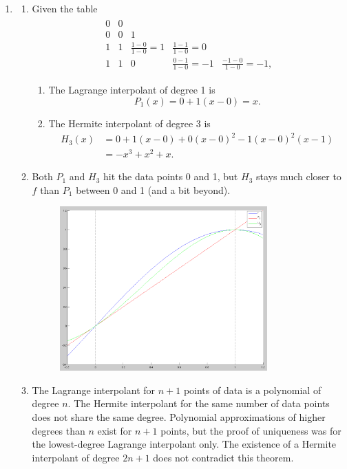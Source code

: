 \documentclass[12pt,letterpaper]{article}
\begin{document}
\begin{enumerate}
  \item
    \begin{enumerate}
      \item Given the table
        \begin{align*}
          \begin{matrix}
            0 & 0 \\
            0 & 0 & 1 \\
            1 & 1 & \frac{1-0}{1-0}=1 & \frac{1-1}{1-0}=0 \\
            1 & 1 & 0 & \frac{0-1}{1-0}=-1 & \frac{-1-0}{1-0}=-1,
          \end{matrix}
        \end{align*}
        \begin{enumerate}
          \item The Lagrange interpolant of degree 1 is
            \[P_1(x) = 0 + 1(x-0) = x.\]
          \item The Hermite interpolant of degree 3 is
          \begin{align*}
            H_3(x) &= 0 + 1(x-0) + 0(x-0)^2 - 1(x-0)^2(x-1) \\
                   &= -x^3 + x^2 + x.
          \end{align*}
        \end{enumerate}

      \item Both $P_1$ and $H_3$ hit the data points 0 and 1, but $H_3$ stays
        much closer to $f$ than $P_1$ between 0 and 1 (and a bit beyond).
        \begin{figure}[!h]
          \centering
          \includegraphics[width=0.8\textwidth]{img/3b.png}
        \end{figure}

      \item The Lagrange interpolant for $n+1$ points of data is a polynomial
        of degree $n$. The Hermite interpolant for the same number of data
        points does not share the same degree. Polynomial approximations of
        higher degrees than $n$ exist for $n+1$ points, but the proof of
        uniqueness was for the lowest-degree Lagrange interpolant only. The
        existence of a Hermite interpolant of degree $2n+1$ does not contradict
        this theorem.
    \end{enumerate}
\end{enumerate}
\end{document}
